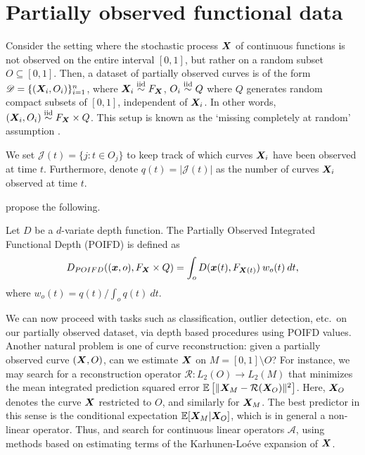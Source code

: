 \section{Partially observed functional data}

Consider the setting where the stochastic process $\bm{X}$ of continuous
functions is not observed on the entire interval $[0, 1]$, but rather on a
random subset $O \subseteq [0, 1]$.
Then, a dataset of partially observed curves is of the form $\mathscr{D} =
\{(\bm{X}_i, O_i)\}_{i = 1}^n$, where $\bm{X}_i \overset{\text{iid}}{\sim} F_{\bm{X}}$, $O_i \overset{\text{iid}}{\sim} Q$ where
$Q$ generates random compact subsets of $[0, 1]$, independent of $\bm{X}_i$.
In other words, $(\bm{X}_i, O_i) \overset{\text{iid}}{\sim} F_{\bm{X}} \times Q$.
This setup is known as the `missing completely at random' assumption
\parencite{kraus-2015}.

We set $\mathscr{J}(t) = \{j\colon t \in O_j\}$ to keep track of which curves
$\bm{X}_i$ have been observed at time $t$.
Furthermore, denote $q(t) = |\mathscr{J}(t)|$ as the number of curves $\bm{X}_i$
observed at time $t$.

\textcite{elias-jimenez-paganoni-sangalli-2023} propose the following.

\begin{definition}
    Let $D$ be a $d$-variate depth function.
    The Partially Observed Integrated Functional Depth (POIFD) is defined as
    \begin{equation}
        D_{POIFD}((\bm{x}, o), F_{\bm{X}} \times Q) = \int_o D(\bm{x}(t), F_{\bm{X}(t)})\:w_o(t) \:dt,
    \end{equation}
    where $w_o(t) = q(t) / \int_o q(t)\:dt$.
\end{definition}

We can now proceed with tasks such as classification, outlier detection, etc.\
on our partially observed dataset, via depth based procedures using POIFD
values.
Another natural problem is one of curve reconstruction: given a partially
observed curve $(\bm{X}, O)$, can we estimate $\bm{X}$ on $M = [0, 1]\setminus O$?
For instance, we may search for a reconstruction operator $\mathcal{R}\colon
L_2(O) \to L_2(M)$ that minimizes the mean integrated prediction squared error
$\operatorname{\mathbb{E}}\left[\Vert \bm{X}_M - \mathcal{R}(\bm{X}_O) \Vert^2\right]$.
Here, $\bm{X}_O$ denotes the curve $\bm{X}$ restricted to $O$, and similarly for
$\bm{X}_M$.
The best predictor in this sense is the conditional expectation $\operatorname{\mathbb{E}}[\bm{X}_M |
\bm{X}_O]$, which is in general a non-linear operator.
Thus, \textcite{kraus-2015} and \textcite{kneip-liebl-2020} search for
continuous linear operators $\mathcal{A}$, using methods based on estimating
terms of the Karhunen-Lo\'eve expansion of $\bm{X}$.

